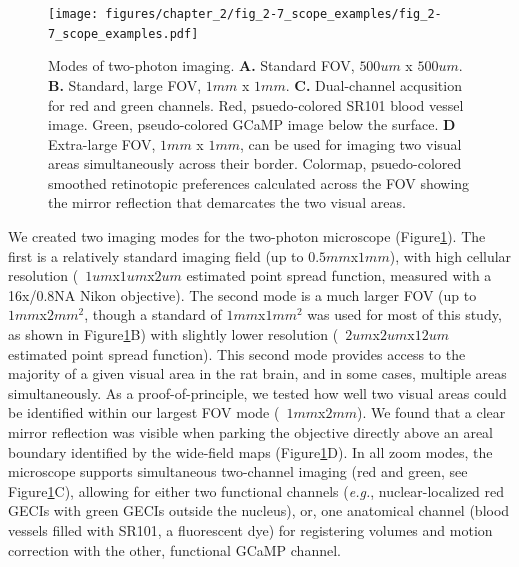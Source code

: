 \begin{figure}[t!]
    \texttt{[image: figures/chapter\_2/fig\_2-7\_scope\_examples/fig\_2-7\_scope\_examples.pdf]}
    \vspace{.1in}
    \caption[Two-photon imaging modes]{Modes of two-photon imaging. \textbf{A.} Standard FOV, $500um$ x $500um$. \textbf{B.} Standard, large FOV, $1mm$ x $1mm$. \textbf{C.} Dual-channel acqusition for red and green channels. Red, psuedo-colored SR101 blood vessel image. Green, pseudo-colored GCaMP image below the surface. \textbf{D} Extra-large FOV, $1mm$ x $1mm$, can be used for imaging two visual areas simultaneously across their border. Colormap, psuedo-colored smoothed retinotopic preferences calculated across the FOV showing the mirror reflection that demarcates the two visual areas. 
    \label{fig:scope_examples}}
\end{figure}

We created two imaging modes for the two-photon microscope (Figure\ref{fig:scope_examples}). The first is a relatively standard imaging field (up to $0.5mm$x$1mm$), with high cellular resolution (~$1um$x$1um$x$2um$ estimated point spread function, measured with a 16x/0.8NA Nikon objective). The second mode is a much larger FOV (up to $1mm$x$2mm^2$, though a standard of $1mm$x$1mm^2$ was used for most of this study, as shown in Figure\ref{fig:scope_examples}B) with slightly lower resolution (~$2um$x$2um$x$12um$ estimated point spread function). This second mode provides access to the majority of a given visual area in the rat brain, and in some cases, multiple areas simultaneously. As a proof-of-principle, we tested how well two visual areas could be identified within our largest FOV mode (~$1mm$x$2mm$). We found that a clear mirror reflection was visible when parking the objective directly above an areal boundary identified by the wide-field maps (Figure\ref{fig:scope_examples}D). In all zoom modes, the microscope supports simultaneous two-channel imaging (red and green, see Figure\ref{fig:scope_examples}C), allowing for either two functional channels (\textit{e.g.}, nuclear-localized red GECIs with green GECIs outside the nucleus), or, one anatomical channel (blood vessels filled with SR101, a fluorescent dye) for registering volumes and motion correction with the other, functional GCaMP channel. 

